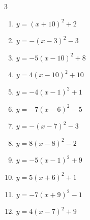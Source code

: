 \begin{multicols}{3}
\begin{enumerate}
  \item $\displaystyle y=\left( x+10\right)^{2}+2$

        \phantom{$\displaystyle 頂点\left( -10 , 2 \right)$}

  \item $\displaystyle y=-\left( x-3\right)^{2}-3$

        \phantom{$\displaystyle 頂点\left( 3 , -3 \right)$}

  \item $\displaystyle y=-5\left( x-10\right)^{2}+8$

        \phantom{$\displaystyle 頂点\left( 10 , 8 \right)$}

  \item $\displaystyle y=4\left( x-10\right)^{2}+10$

        \phantom{$\displaystyle 頂点\left( 10 , 10 \right)$}

  \item $\displaystyle y=-4\left( x-1\right)^{2}+1$

        \phantom{$\displaystyle 頂点\left( 1 , 1 \right)$}

  \item $\displaystyle y=-7\left( x-6\right)^{2}-5$

        \phantom{$\displaystyle 頂点\left( 6 , -5 \right)$}

  \item $\displaystyle y=-\left( x-7\right)^{2}-3$

        \phantom{$\displaystyle 頂点\left( 7 , -3 \right)$}

  \item $\displaystyle y=8\left( x-8\right)^{2}-2$

        \phantom{$\displaystyle 頂点\left( 8 , -2 \right)$}

  \item $\displaystyle y=-5\left( x-1\right)^{2}+9$

        \phantom{$\displaystyle 頂点\left( 1 , 9 \right)$}

  \item $\displaystyle y=5\left( x+6\right)^{2}+1$

        \phantom{$\displaystyle 頂点\left( -6 , 1 \right)$}

  \item $\displaystyle y=-7\left( x+9\right)^{2}-1$

        \phantom{$\displaystyle 頂点\left( -9 , -1 \right)$}

  \item $\displaystyle y=4\left( x-7\right)^{2}+9$


\end{enumerate}
\end{multicols}
